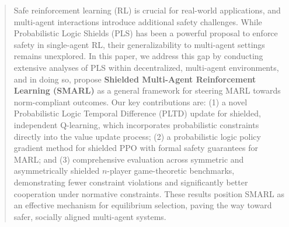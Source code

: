\documentclass{ecai}
\theoremstyle{plain}
\theoremstyle{definition}
\theoremstyle{remark}
\begin{document}
\begin{frontmatter}
\begin{abstract}
Safe reinforcement learning (RL) is crucial for real-world applications, and multi-agent interactions introduce additional safety challenges. While Probabilistic Logic Shields (PLS) has been a powerful proposal to enforce safety in single-agent RL, their generalizability to multi-agent settings remains unexplored. In this paper, we address this gap by conducting extensive analyses of PLS within decentralized, multi-agent environments, and in doing so, propose \textbf{Shielded Multi-Agent Reinforcement Learning (SMARL)} as a general framework for steering MARL towards norm-compliant outcomes. Our key contributions are: (1) a novel Probabilistic Logic Temporal Difference (PLTD) update for shielded, independent Q-learning, which incorporates probabilistic constraints directly into the value update process; (2) a probabilistic logic policy gradient method for shielded PPO with formal safety guarantees for MARL; and (3) comprehensive evaluation across symmetric and asymmetrically shielded $n$-player game-theoretic benchmarks, demonstrating fewer constraint violations and significantly better cooperation under normative constraints. These results position SMARL as an effective mechanism for equilibrium selection, paving the way toward safer, socially aligned multi-agent systems.







\end{abstract}

\end{frontmatter}
\end{document}
